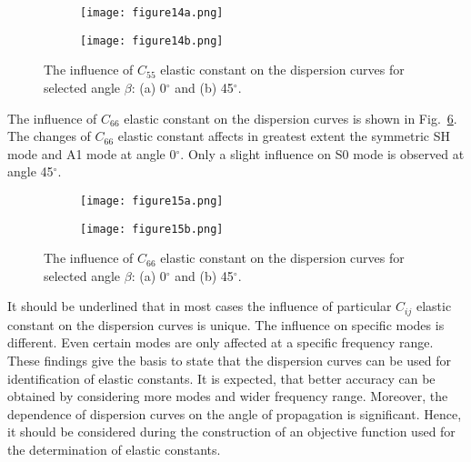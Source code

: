 \documentclass[preprint,12pt]{elsarticle}
\begin{document}
\begin{figure} [h!]
	\centering
	\begin{subfigure}[b]{0.47\textwidth}
		\centering
		\texttt{[image: figure14a.png]}
		\caption{}
		\label{fig:C55_0}
	\end{subfigure}
	\hfill
	\begin{subfigure}[b]{0.47\textwidth}
		\centering
		\texttt{[image: figure14b.png]}
		\caption{}
		\label{fig:C55_45}
	\end{subfigure}
	\caption{The influence of \(C_{55}\) elastic constant on the dispersion curves for selected angle \(\beta\): (a) 0\(^{\circ}\) and (b) 45\(^{\circ}\).} 
	\label{fig:C55}
\end{figure}

 The influence of \(C_{66}\) elastic constant on the dispersion curves is shown in Fig.~\ref{fig:C66}.
 The changes of \(C_{66}\) elastic constant affects in greatest extent the symmetric SH mode and A1 mode at angle 0\(^{\circ}\).
 Only a slight influence on S0 mode is observed at angle 45\(^{\circ}\).
 
\begin{figure} [h!]
	\centering
	\begin{subfigure}[b]{0.47\textwidth}
		\centering
		\texttt{[image: figure15a.png]}
		\caption{}
		\label{fig:C66_0}
	\end{subfigure}
	\hfill
	\begin{subfigure}[b]{0.47\textwidth}
		\centering
		\texttt{[image: figure15b.png]}
		\caption{}
		\label{fig:C66_45}
	\end{subfigure}
	\caption{The influence of \(C_{66}\) elastic constant on the dispersion curves for selected angle \(\beta\): (a) 0\(^{\circ}\) and (b) 45\(^{\circ}\).} 
	\label{fig:C66}
\end{figure}

It should be underlined that in most cases the influence of  particular \(C_{ij}\) elastic constant on the dispersion curves is unique.
The influence on specific modes is different.
Even certain modes are only affected at a specific frequency range.
These findings give the basis to state that the dispersion curves can be used for identification of elastic constants.
It is expected, that better accuracy can be obtained by considering more modes and wider frequency range.
Moreover, the dependence of dispersion curves on the angle of propagation is significant. 
Hence, it should be considered during the construction of an objective function used for the determination of elastic constants.
\end{document}
